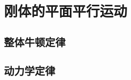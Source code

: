 

\section{刚体的平面平行运动}\label{7-2}

\subsection{整体牛顿定律}\label{7-2-1}

\subsection{动力学定律}\label{7-2-2}

